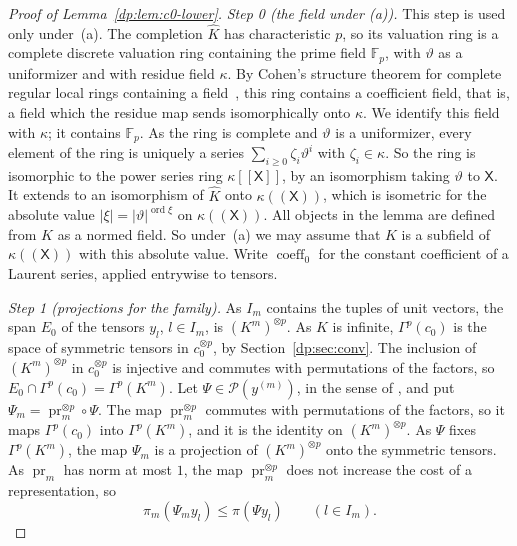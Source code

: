 \documentclass[11pt]{amsart}
\theoremstyle{definition}
\theoremstyle{remark}
\numberwithin{equation}{section}
\newcommand{\F}{\mathbb F}
\newcommand{\abs}[1]{\lvert #1\rvert}
\newcommand{\coeff}{\operatorname{coeff}}
\newcommand{\ord}{\operatorname{ord}}
\newcommand{\Kh}{\widehat K}
\theoremstyle{plain}
\theoremstyle{definition}
\theoremstyle{plain}
\begin{document}
\begin{proof}[Proof of Lemma~\ref{dp:lem:c0-lower}]
\emph{Step 0 (the field under (a)).} This step is used only under~(a). The completion $\Kh$ has characteristic $p$, so its valuation ring is a complete discrete valuation ring containing the prime field $\F_p$, with $\vartheta$ as a uniformizer and with residue field $\kappa$. By Cohen's structure theorem for complete regular local rings containing a field~\cite{Co}, this ring contains a coefficient field, that is, a field which the residue map sends isomorphically onto $\kappa$. We identify this field with $\kappa$; it contains $\F_p$. As the ring is complete and $\vartheta$ is a uniformizer, every element of the ring is uniquely a series $\sum_{i\ge0}\zeta_i\vartheta^i$ with $\zeta_i\in\kappa$. So the ring is isomorphic to the power series ring $\kappa[[\mathsf X]]$, by an isomorphism taking $\vartheta$ to $\mathsf X$. It extends to an isomorphism of $\Kh$ onto $\kappa((\mathsf X))$, which is isometric for the absolute value $\abs\xi=\abs\vartheta^{\ord\xi}$ on $\kappa((\mathsf X))$. All objects in the lemma are defined from $K$ as a normed field. So under~(a) we may assume that $K$ is a subfield of $\kappa((\mathsf X))$ with this absolute value. Write $\coeff_0$ for the constant coefficient of a Laurent series, applied entrywise to tensors.

\emph{Step 1 (projections for the family).} As $I_m$ contains the tuples of unit vectors, the span $E_0$ of the tensors $y_l$, $l\in I_m$, is $(K^m)^{\otimes p}$. As $K$ is infinite, $\Gamma^p(c_0)$ is the space of symmetric tensors in $c_0^{\otimes p}$, by Section~\ref{dp:sec:conv}. The inclusion of $(K^m)^{\otimes p}$ in $c_0^{\otimes p}$ is injective and commutes with permutations of the factors, so $E_0\cap\Gamma^p(c_0)=\Gamma^p(K^m)$. Let $\Psi\in\mathcal P(y^{(m)})$, in the sense of \cite[Definition~14.15]{I}, and put $\Psi_m=\operatorname{pr}_m^{\otimes p}\circ\Psi$. The map $\operatorname{pr}_m^{\otimes p}$ commutes with permutations of the factors, so it maps $\Gamma^p(c_0)$ into $\Gamma^p(K^m)$, and it is the identity on $(K^m)^{\otimes p}$. As $\Psi$ fixes $\Gamma^p(K^m)$, the map $\Psi_m$ is a projection of $(K^m)^{\otimes p}$ onto the symmetric tensors. As $\operatorname{pr}_m$ has norm at most $1$, the map $\operatorname{pr}_m^{\otimes p}$ does not increase the cost of a representation, so
\begin{equation}\label{dp:af:projection-cost}
 \pi_m(\Psi_my_l)\le\pi(\Psi y_l)\qquad(l\in I_m).
\end{equation}


\end{proof}
\end{document}
